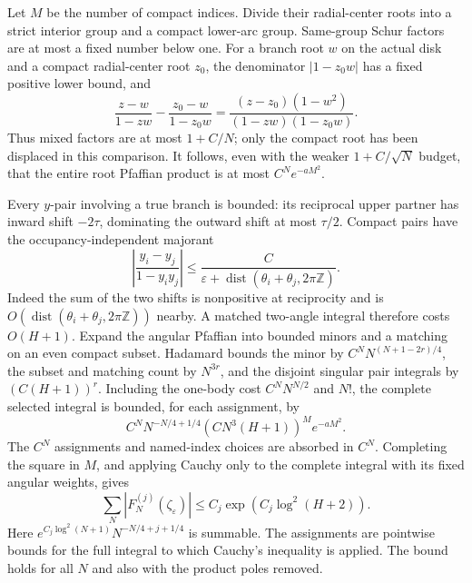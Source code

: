 \documentclass[11pt]{article}
\numberwithin{equation}{section}
\theoremstyle{definition}
\newcommand{\Z}{\mathbb Z}
\newcommand{\eps}{\varepsilon}
\DeclareMathOperator{\dist}{dist}
\begin{document}
Let $M$ be the number of compact indices. Divide their radial-center roots
into a strict interior group and a compact lower-arc group. Same-group
Schur factors are at most a fixed number below one. For a branch root
$w$ on the actual disk and a compact radial-center root $z_0$, the
denominator $|1-z_0w|$ has a fixed positive lower bound, and
\[
 \frac{z-w}{1-zw}-\frac{z_0-w}{1-z_0w}
 =\frac{(z-z_0)(1-w^2)}{(1-zw)(1-z_0w)}.
\]
Thus mixed factors are at most $1+C/N$; only the compact root has been
displaced in this comparison. It follows, even with the weaker
$1+C/\sqrt N$ budget, that the entire root Pfaffian product is at most
$C^N e^{-aM^2}$.

Every $y$-pair involving a true branch is bounded: its reciprocal upper
partner has inward shift $-2\tau$, dominating the outward shift at most
$\tau/2$. Compact pairs have the occupancy-independent majorant
\[
 \left|\frac{y_i-y_j}{1-y_iy_j}\right|
 \le\frac C{\eps+\dist(\theta_i+\theta_j,2\pi\Z)}.
\]
Indeed the sum of the two shifts is nonpositive at reciprocity and is
$O(\dist(\theta_i+\theta_j,2\pi\Z))$ nearby. A matched two-angle
integral therefore costs $O(H+1)$.
Expand the angular Pfaffian into bounded minors and a matching on an
even compact subset. Hadamard bounds the minor by
$C^N N^{(N+1-2r)/4}$, the subset and matching count by $N^{3r}$,
and the disjoint singular pair integrals by $(C(H+1))^r$.
Including the one-body cost $C^NN^{N/2}$ and $N!$, the complete
selected integral is bounded, for each assignment, by
\[
 C^N N^{-N/4+1/4}(CN^3(H+1))^M e^{-aM^2}.
\]
The $C^N$ assignments and named-index choices are absorbed in $C^N$.
Completing the square in $M$, and applying Cauchy only to the complete
integral with its fixed angular weights, gives
\begin{equation}
 \sum_N|F_N^{(j)}(\zeta_\eps)|
 \le C_j\exp(C_j\log^2(H+2)).
 \label{iso:selected-bound}
\end{equation}
Here $e^{C_j\log^2(N+1)}N^{-N/4+j+1/4}$ is summable.
The assignments are pointwise bounds for the full integral to which
Cauchy's inequality is applied. The bound holds for all \(N\) and
also with the product poles removed.
\end{document}
